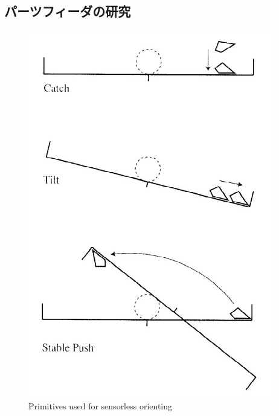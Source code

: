 \documentclass[a4paper,twoside,12pt,papersize, dvipdfmx]{iirthesis}
\begin{document}
\subsection{パーツフィーダの研究}
\begin{figure}[t]
\begin{minipage}{0.49\hsize}
\centering
\includegraphics[width=0.9\hsize]{fig/1-introduction/Akella/sensorless_movement.jpg}
\caption{Primitives used for sensorless orienting \cite{akella2000}}
\label{fig::sensmov}
\end{minipage}
\begin{minipage}{0.5\hsize}
\centering

\end{minipage}
\end{figure}
\end{document}
